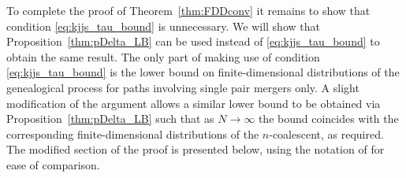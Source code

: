 To complete the proof of Theorem~\ref{thm:FDDconv} it remains to show that condition \eqref{eq:kjjs_tau_bound} is unnecessary. We will show that Proposition~\ref{thm:pDelta_LB} can be used instead of \eqref{eq:kjjs_tau_bound} to obtain the same result.
The only part of \textcite[Proof of Theorem 1]{koskela2018} making use of condition \eqref{eq:kjjs_tau_bound} is the lower bound on finite-dimensional distributions of the genealogical process for paths involving single pair mergers only.
A slight modification of the argument allows a similar lower bound to be obtained via Proposition~\ref{thm:pDelta_LB} such that as $N\to\infty$ the bound coincides with the corresponding finite-dimensional distributions of the $n$-coalescent, as required.
The modified section of the proof is presented below, using the notation of \textcite{koskela2018} for ease of comparison.

